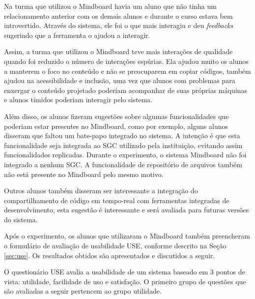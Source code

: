 
Na turma que utilizou o Mindboard havia um aluno que não tinha um relacionamento anterior com os demais alunos e durante o curso estava bem introvertido. Através do sistema, ele foi o que mais interagiu e deu \emph{feedbacks} sugerindo que a ferramenta o ajudou a interagir.

Assim, a turma que utilizou o Mindboard teve mais interações de qualidade quando foi reduzido o número de interações espúrias. Ela ajudou muito os alunos a manterem o foco no conteúdo e não se preocuparem em copiar códigos, também ajudou na acessibilidade e inclusão, uma vez que alunos com problemas para enxergar o conteúdo projetado poderiam acompanhar de suas próprias máquinas e alunos tímidos poderiam interagir pelo sistema.

Além disso, os alunos fizeram sugestões sobre algumas funcionalidades que poderiam estar presentes no Mindboard, como por exemplo, alguns alunos disseram que faltou um bate-papo integrado no sistema. A intenção é que esta funcionalidade seja integrada ao SGC utilizado pela instituição, evitando assim funcionalidades replicadas. Durante o experimento, o sistema Mindboard não foi integrado a nenhum SGC. A funcionalidade de repositório de arquivos também não está presente no Mindboard pelo mesmo motivo.

Outros alunos também disseram ser interessante a integração do compartilhamento de código em tempo-real com ferramentas integradas de desenvolvimento, esta sugestão é interessante e será avaliada para futuras versões do sistema.

Após o experimento, os alunos que utilizaram o Mindboard também preencheram o formulário de avaliação de usabilidade USE, conforme descrito na Seção \ref{sec:use}. Os resultados obtidos são apresentados e discutidos a seguir.

O questionário USE avalia a usabilidade de um sistema baseado em 3 pontos de vista: utilidade, facilidade de uso e satisfação. O primeiro grupo de questões que são avaliadas a seguir pertencem ao grupo utilidade. 



